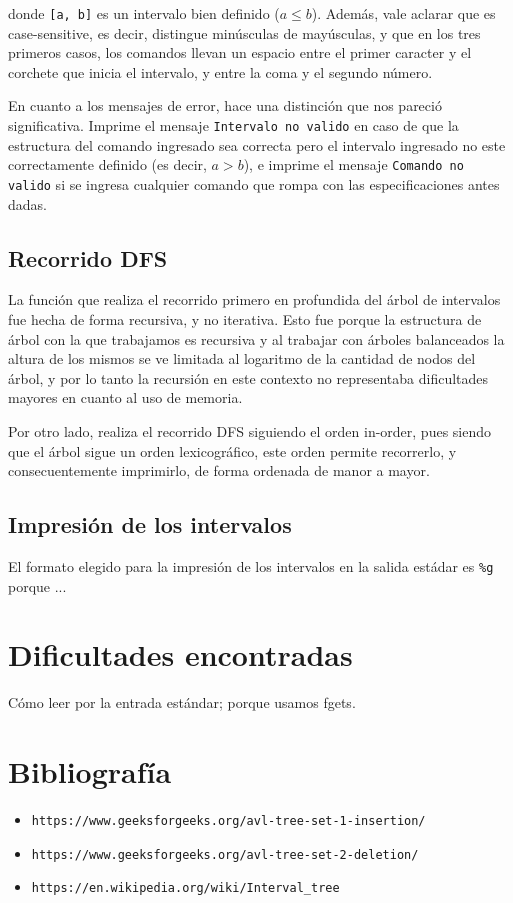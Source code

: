 \documentclass[11pt]{article}
\begin{document}
\noindent donde \verb|[a, b]| es un intervalo bien definido ($a \le b$).
Además, vale aclarar que es case-sensitive, es decir, distingue minúsculas de mayúsculas, y que en los tres primeros casos, los comandos llevan un espacio entre el primer caracter y el corchete que inicia el intervalo, y entre la coma y el segundo número. \par

En cuanto a los mensajes de error, hace una distinción que nos pareció significativa. Imprime el mensaje \verb|Intervalo no valido| en caso de que la estructura del comando ingresado sea correcta pero el intervalo ingresado no este correctamente definido (es decir, $a > b$), 
e imprime el mensaje \verb|Comando no valido| si se ingresa cualquier comando que rompa con las especificaciones antes dadas. \par

\subsection{Recorrido DFS}

La función que realiza el recorrido primero en profundida del árbol de intervalos fue hecha de forma recursiva, y no iterativa. 
Esto fue porque la estructura de árbol con la que trabajamos es recursiva y al trabajar con árboles balanceados la altura de los mismos se ve limitada al logaritmo de la cantidad de nodos del árbol, y por lo tanto la recursión en este contexto no representaba dificultades mayores en cuanto al uso de memoria. \par
Por otro lado, realiza el recorrido DFS siguiendo el orden in-order, pues siendo que el árbol sigue un orden lexicográfico, este orden permite recorrerlo, y consecuentemente imprimirlo, de forma ordenada de manor a mayor. \par

\subsection{Impresión de los intervalos}

El formato elegido para la impresión de los intervalos en la salida estádar es \verb|%g| porque ... 


\section{Dificultades encontradas}

Cómo leer por la entrada estándar; porque usamos fgets.


\section{Bibliografía}
\begin{itemize}
    \item \verb|https://www.geeksforgeeks.org/avl-tree-set-1-insertion/|
    \item \verb|https://www.geeksforgeeks.org/avl-tree-set-2-deletion/|
    \item \verb|https://en.wikipedia.org/wiki/Interval_tree|
\end{itemize}
\end{document}
